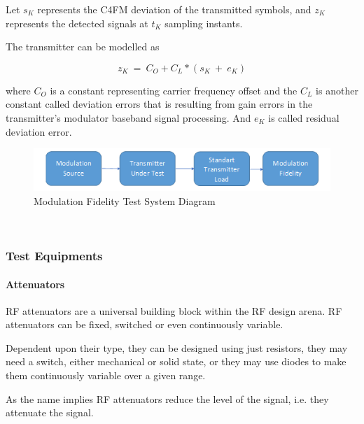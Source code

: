 	Let $s_K$ represents the C4FM deviation of the transmitted symbols, and $z_K$ represents the detected signals at $t_K$ sampling instants.
	
	The transmitter can be modelled as
	
	$$ z_K~=~C_O+C_L*(s_K~+~e_K) $$
	
	where $C_O$ is a constant representing carrier frequency offset and the $C_L$ is another constant called deviation errors that is resulting from gain errors in the transmitter's modulator baseband signal processing. And $e_K$ is called residual deviation error.
	
	
\begin{figure}[H]
	\center
	\setlength{\unitlength}{\textwidth} 
	\includegraphics[width=1.0\unitlength]{modfide}
	\caption{\label{fig:modfide}Modulation Fidelity Test System Diagram }
\end{figure}



\- \\[1.5cm] \- \vfill

\subsubsection{Test Equipments} 

\paragraph{Attenuators}

	RF attenuators are a universal building block within the RF design arena. RF attenuators can be fixed, switched or even continuously variable.

Dependent upon their type, they can be designed using just resistors, they may need a switch, either mechanical or solid state, or they may use diodes to make them continuously variable over a given range.

	As the name implies RF attenuators reduce the level of the signal, i.e. they attenuate the signal.

